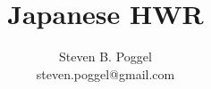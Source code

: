 
\title{Japanese HWR}
\author{Steven B. Poggel\\
steven.poggel@gmail.com}

%

\maketitle




%

%

\thispagestyle{empty}
\tableofcontents

%



%

%

\fontsize{11pt}{13}\selectfont
